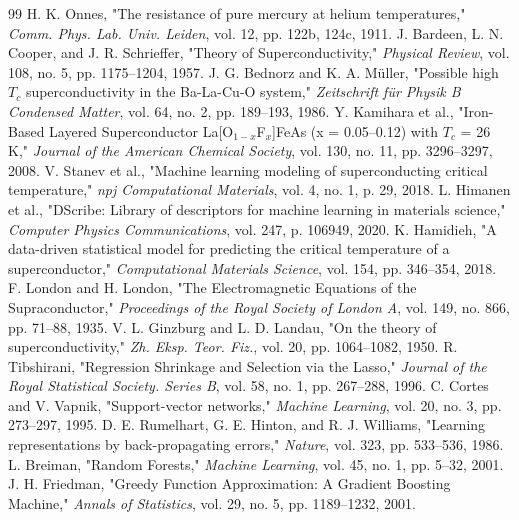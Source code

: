 \documentclass[12pt, a4paper, oneside]{report}
\begin{document}
\begin{thebibliography}{99}
     H. K. Onnes, "The resistance of pure mercury at helium temperatures," \textit{Comm. Phys. Lab. Univ. Leiden}, vol. 12, pp. 122b, 124c, 1911.
     J. Bardeen, L. N. Cooper, and J. R. Schrieffer, "Theory of Superconductivity," \textit{Physical Review}, vol. 108, no. 5, pp. 1175--1204, 1957.
     J. G. Bednorz and K. A. Müller, "Possible high $T_c$ superconductivity in the Ba-La-Cu-O system," \textit{Zeitschrift für Physik B Condensed Matter}, vol. 64, no. 2, pp. 189--193, 1986.
     Y. Kamihara et al., "Iron-Based Layered Superconductor La[O$_{1-x}$F$_x$]FeAs (x = 0.05--0.12) with $T_c$ = 26 K," \textit{Journal of the American Chemical Society}, vol. 130, no. 11, pp. 3296--3297, 2008.
     V. Stanev et al., "Machine learning modeling of superconducting critical temperature," \textit{npj Computational Materials}, vol. 4, no. 1, p. 29, 2018.
     L. Himanen et al., "DScribe: Library of descriptors for machine learning in materials science," \textit{Computer Physics Communications}, vol. 247, p. 106949, 2020.
     K. Hamidieh, "A data-driven statistical model for predicting the critical temperature of a superconductor," \textit{Computational Materials Science}, vol. 154, pp. 346--354, 2018.
     F. London and H. London, "The Electromagnetic Equations of the Supraconductor," \textit{Proceedings of the Royal Society of London A}, vol. 149, no. 866, pp. 71--88, 1935.
     V. L. Ginzburg and L. D. Landau, "On the theory of superconductivity," \textit{Zh. Eksp. Teor. Fiz.}, vol. 20, pp. 1064--1082, 1950.
     R. Tibshirani, "Regression Shrinkage and Selection via the Lasso," \textit{Journal of the Royal Statistical Society. Series B}, vol. 58, no. 1, pp. 267--288, 1996.
     C. Cortes and V. Vapnik, "Support-vector networks," \textit{Machine Learning}, vol. 20, no. 3, pp. 273--297, 1995.
     D. E. Rumelhart, G. E. Hinton, and R. J. Williams, "Learning representations by back-propagating errors," \textit{Nature}, vol. 323, pp. 533--536, 1986.
     L. Breiman, "Random Forests," \textit{Machine Learning}, vol. 45, no. 1, pp. 5--32, 2001.
     J. H. Friedman, "Greedy Function Approximation: A Gradient Boosting Machine," \textit{Annals of Statistics}, vol. 29, no. 5, pp. 1189--1232, 2001.

\end{thebibliography}
\end{document}
